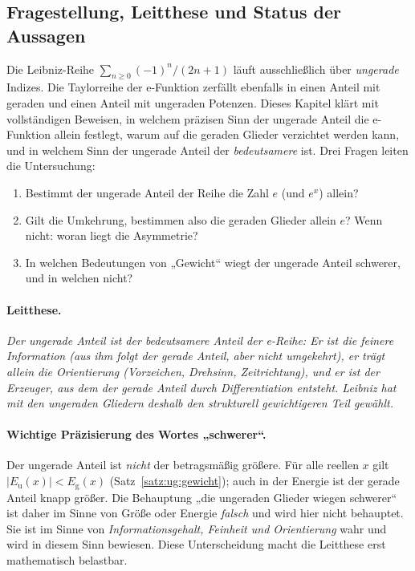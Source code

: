 \documentclass[a4paper,12pt,twoside]{report}
\theoremstyle{definition}
\begin{document}
\subsection{Fragestellung, Leitthese und Status der Aussagen}
\label{sec:ug:frage}

Die Leibniz-Reihe $\sum_{n\ge 0}(-1)^n/(2n+1)$ läuft ausschließlich über \emph{ungerade} Indizes. Die Taylorreihe der e-Funktion zerfällt ebenfalls in einen Anteil mit geraden und einen Anteil mit ungeraden Potenzen. Dieses Kapitel klärt mit vollständigen Beweisen, in welchem präzisen Sinn der ungerade Anteil die e-Funktion allein festlegt, warum auf die geraden Glieder verzichtet werden kann, und in welchem Sinn der ungerade Anteil der \emph{bedeutsamere} ist. Drei Fragen leiten die Untersuchung:

\begin{enumerate}[label=\textbf{F\arabic*.}]
\item Bestimmt der ungerade Anteil der Reihe die Zahl $e$ (und $e^x$) allein?
\item Gilt die Umkehrung, bestimmen also die geraden Glieder allein $e$? Wenn nicht: woran liegt die Asymmetrie?
\item In welchen Bedeutungen von „Gewicht“ wiegt der ungerade Anteil schwerer, und in welchen nicht?
\end{enumerate}

\paragraph{Leitthese.}
\emph{Der ungerade Anteil ist der bedeutsamere Anteil der e-Reihe: Er ist die feinere Information (aus ihm folgt der gerade Anteil, aber nicht umgekehrt), er trägt allein die Orientierung (Vorzeichen, Drehsinn, Zeitrichtung), und er ist der Erzeuger, aus dem der gerade Anteil durch Differentiation entsteht. Leibniz hat mit den ungeraden Gliedern deshalb den strukturell gewichtigeren Teil gewählt.}

\paragraph{Wichtige Präzisierung des Wortes „schwerer“.}
Der ungerade Anteil ist \emph{nicht} der betragsmäßig größere. Für alle reellen $x$ gilt $|E_{\mathrm u}(x)|<E_{\mathrm g}(x)$ (Satz~\ref{satz:ug:gewicht}); auch in der Energie ist der gerade Anteil knapp größer. Die Behauptung „die ungeraden Glieder wiegen schwerer“ ist daher im Sinne von Größe oder Energie \emph{falsch} und wird hier nicht behauptet. Sie ist im Sinne von \emph{Informationsgehalt, Feinheit und Orientierung} wahr und wird in diesem Sinn bewiesen. Diese Unterscheidung macht die Leitthese erst mathematisch belastbar.
\end{document}
